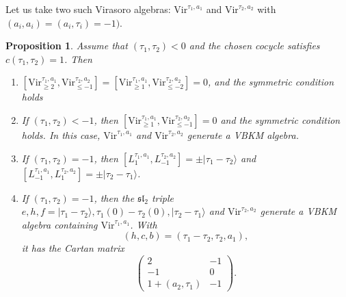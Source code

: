 \documentclass[11pt]{amsart}
\newcommand{\ket}[1]{|#1\rangle}
\renewcommand{\le}{\leqslant}
\renewcommand{\ge}{\geqslant}
\newcommand{\Vir}{\mathrm{Vir}}
\renewcommand{\sl}{\mathfrak{sl}}
\numberwithin{equation}{section}
\theoremstyle{plain}
\newtheorem{proposition}[theorem]{Proposition}
\theoremstyle{definition}
\begin{document}
Let us take two such Virasoro algebras: $\Vir^{\tau_1,a_1}$ and $\Vir^{\tau_2,a_2}$ with $(a_i,a_i)=(a_i,\tau_i)=-1)$.
\begin{proposition}\label{p:relations_between_Virasoros_in_lattice_VOAs}
    Assume that $(\tau_1,\tau_2)<0$ and the chosen cocycle satisfies $c(\tau_1,\tau_2)=1$. Then
    \begin{enumerate}[label=(\roman*)]
        \item $[{\Vir_{\ge 2}^{\tau_1,a_1},\Vir_{\le -1}^{\tau_2,a_2}}]=[{\Vir_{\ge 1}^{\tau_1,a_1},\Vir_{\le -2}^{\tau_2,a_2}}]=0$, and the symmetric condition holds
        \item If $(\tau_1,\tau_2)<-1$, then $[{\Vir_{\ge 1}^{\tau_1,a_1},\Vir_{\le -1}^{\tau_2,a_2}}]=0$ and the symmetric condition holds. In this case, $\Vir^{\tau_1,a_1}$ and $\Vir^{\tau_2,a_2}$ generate a VBKM algebra.
        \item If $(\tau_1,\tau_2)=-1$, then $[L_{1}^{\tau_1,a_1},L_{-1}^{\tau_2,a_2}]=\pm \ket{\tau_1-\tau_2}$ and $[L_{-1}^{\tau_1,a_1},L_{1}^{\tau_2,a_2}]=\pm \ket{\tau_2-\tau_1}$.
        \item If $(\tau_1,\tau_2)=-1$, then the $\sl_2$ triple $e,h,f=\ket{\tau_1-\tau_2},\tau_1(0)-\tau_2(0), \ket{\tau_2-\tau_1}$ and $\Vir^{\tau_2,a_2}$ generate a VBKM algebra containing $\Vir^{\tau_1,a_1}$. With
        $$
        (h,c,b)=(\tau_1-\tau_2,\tau_2,a_1),
        $$
        it has the Cartan matrix
        $$
        \begin{pmatrix}
            2&-1\\
            -1&0\\
            1+(a_2,\tau_1)&-1
        \end{pmatrix}.
        $$
    \end{enumerate}
\end{proposition}
\end{document}
